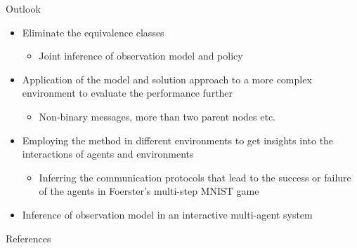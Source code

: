 \documentclass[
english,%
aspectratio=169,%
color={accentcolor=3b},
logo=true,%
colorframetitle=false,%
]{tudabeamer}
\begin{document}
\begin{frame}{Outlook}
\vspace{-5pt}
\begin{itemize}
\item Eliminate the equivalence classes
\begin{itemize}
\item Joint inference of observation model and policy
\end{itemize}
\item Application of the model and solution approach to a more complex
environment to evaluate the performance further
\begin{itemize}
\item Non-binary messages, more than two parent nodes etc.
\end{itemize}
\item Employing the method in different environments to get insights
into the interactions of agents and environments
\begin{itemize}
\item Inferring the communication protocols that lead
to the success or failure of the agents in Foerster's multi-step MNIST game \cite{Foerster2016}
\end{itemize}
\item Inference of observation model in an interactive multi-agent system
\end{itemize}
\centering
{}
\end{frame}


\begin{frame}{References}
\vspace{-10pt}
\small


\end{frame}
\end{document}
